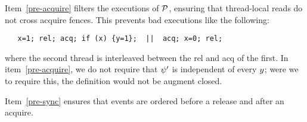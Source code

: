 


Item~\ref{pre-acquire} filters the executions of $\mathcal{P}$, ensuring that
thread-local reads do not cross acquire fences.  This prevents bad executions
like the following:
\begin{verbatim}
   x=1; rel; acq; if (x) {y=1};  ||  acq; x=0; rel; 
\end{verbatim}
where the second thread is interleaved between the rel and acq of the first.
In item~\ref{pre-acquire}, we do not require that $\psi'$ is independent of
every $y$; were we to require this, the definition would not be augment closed.

Item~\ref{pre-sync} ensures that events are ordered before a release and
after an acquire.

